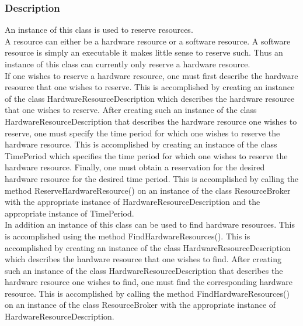 \documentclass[$Date: 2003/06/26 19:29:31 $]{glabarticle}
\begin{document}

\subsubsection{Description}

An instance of this class is used to reserve resources. \\

A resource can either be a hardware resource or a software resource. A
software resource is simply an executable it makes little sense to
reserve such. Thus an instance of this class can currently only reserve a
hardware resource. \\

If one wishes to reserve a hardware resource, one must first describe
the hardware resource that one wishes to reserve. This is accomplished
by creating an instance of the class HardwareResourceDescription which
describes the hardware resource that one wishes to reserve. After
creating such an instance of the class HardwareResourceDescription
that describes the hardware resource one wishes to reserve, one must
specify the time period for which one wishes to reserve the hardware
resource. This is accomplished by creating an instance of the class
TimePeriod which specifies the time period for which one wishes to
reserve the hardware resource. Finally, one must obtain a reservation
for the desired hardware resource for the desired time period. This is
accomplished by calling the method ReserveHardwareResource() on an
instance of the class ResourceBroker with the appropriate instance of
HardwareResourceDescription and the appropriate instance of
TimePeriod. \\

In addition an instance of this class can be used to find hardware resources.
This is accomplished using the method FindHardwareResources(). This is 
accomplished by creating an instance of the class HardwareResourceDescription 
which describes the hardware resource that one wishes to find. After
creating such an instance of the class HardwareResourceDescription
that describes the hardware resource one wishes to find, one must 
find the corresponding hardware resource. This is accomplished by calling the 
method FindHardwareResources() on an instance of the class ResourceBroker 
with the appropriate instance of HardwareResourceDescription. \\

\end{document}
